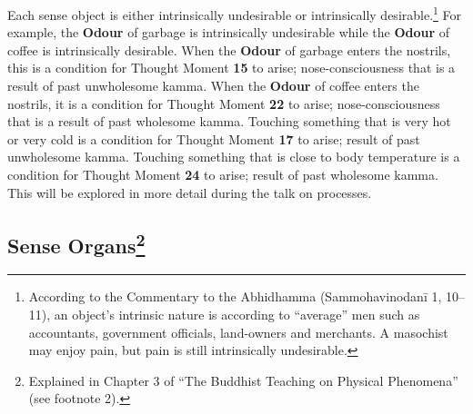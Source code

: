 Each sense object is either intrinsically undesirable or intrinsically desirable.\footnote{According to the Commentary to the Abhidhamma (Sammohavinodanī 1, 10--11), an object’s intrinsic nature is according to “average” men such as accountants, government officials, land-owners and merchants. A masochist may enjoy pain, but pain is still intrinsically undesirable.} For example, the \textbf{Odour} of garbage is intrinsically undesirable while the \textbf{Odour} of coffee is intrinsically desirable. When the \textbf{Odour} of garbage enters the nostrils, this is a condition for Thought Moment \textbf{15} to arise; nose-consciousness that is a result of past unwholesome kamma. When the \textbf{Odour} of coffee enters the nostrils, it is a condition for Thought Moment \textbf{22} to arise; nose-consciousness that is a result of past wholesome kamma. Touching something that is very hot or very cold is a condition for Thought Moment \textbf{17} to arise; result of past unwholesome kamma. Touching something that is close to body temperature is a condition for Thought Moment \textbf{24} to arise; result of past wholesome kamma. This will be explored in more detail during the talk on processes.

\subsection*{Sense Organs\footnote{Explained in Chapter 3 of “The Buddhist Teaching on Physical Phenomena” (see footnote 2).}}

